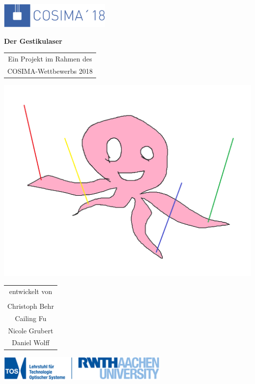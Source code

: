 \documentclass[a4paper,12pt,notumble]{leaflet}
\begin{document}
\begin{center}

\includegraphics[height=1.25cm]{../Logos/Cosima18.png}

\bfseries\Huge
Der Gestikulaser

\vfill

\normalsize

\begin{tabular}{c}
	Ein Projekt im Rahmen des \\
	COSIMA-Wettbewerbs 2018
\end{tabular}

\vfill
\includegraphics[scale=0.25]{../Logos/gestikulaser.png}
\vfill

\begin{tabular}{c}
	entwickelt von \\ \\
	Christoph Behr \\
	Cailing Fu \\
	Nicole Grubert \\
	Daniel Wolff
\end{tabular}

\vfill

\includegraphics[height=1.25cm]{../Logos/TOS.png}

\end{center}
\end{document}
